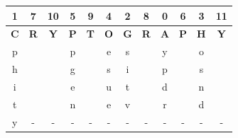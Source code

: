 \documentclass{ashoka-crypto}
\begin{document}
\begin{center}
\begin{tabular}{|c|c|c|c|c|c|c|c|c|c|c|c|}
\hline
1          & 7          & 10         & 5          & 9          & 4          & 2          & 8          & 0          & 6          & 3          & 11         \\ \hline
\textbf{C} & \textbf{R} & \textbf{Y} & \textbf{P} & \textbf{T} & \textbf{O} & \textbf{G} & \textbf{R} & \textbf{A} & \textbf{P} & \textbf{H} & \textbf{Y} \\ \hline
p          &            &            & p          &            & e          & s          &            & y          &            & o          &            \\ \hline
h          &            &            & g          &            & s          & i          &            & p          &            & s          &            \\ \hline
i          &            &            & e          &            & u          & t          &            & d          &            & n          &            \\ \hline
t          &            &            & n          &            & e          & v          &            & r          &            & d          &            \\ \hline
y          &     -       &    -        &      -     &     -       &      -      &     -       &     -       &      -      &     -       &       -     &  -            \\ \hline
\end{tabular}
\end{center}
\end{document}
